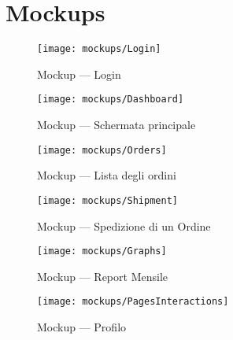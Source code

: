 \chapter{Mockups}

\begin{figure}[H]
  \centering
  \begin{minipage}{0.4\textwidth}
    \centering
    \texttt{[image: mockups/Login]}
    \caption{Mockup --- Login}
  \end{minipage}\hfill
  \begin{minipage}{0.4\textwidth}
    \centering
    \texttt{[image: mockups/Dashboard]}
    \caption{Mockup --- Schermata principale}
  \end{minipage}
\end{figure}

\begin{figure}[H]
  \centering
  \begin{minipage}{0.4\textwidth}
    \centering
    \texttt{[image: mockups/Orders]}
    \caption{Mockup --- Lista degli ordini}
  \end{minipage}\hfill
  \begin{minipage}{0.4\textwidth}
    \centering
    \texttt{[image: mockups/Shipment]}
    \caption{Mockup --- Spedizione di un Ordine}
  \end{minipage}
\end{figure}

\begin{figure}[H]
  \centering
  \texttt{[image: mockups/Graphs]}
  \caption{Mockup --- Report Mensile}
\end{figure}

\newpage

\begin{figure}[H]
  \centering
  \texttt{[image: mockups/PagesInteractions]}
  \caption{Mockup --- Profilo}
\end{figure}